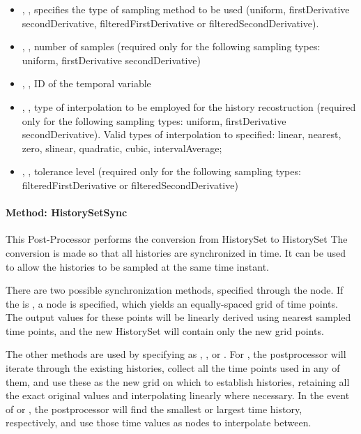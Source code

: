 \begin{itemize}
   \item {}, , specifies the type of sampling method to be used (uniform, firstDerivative secondDerivative, filteredFirstDerivative or
   filteredSecondDerivative).
   \item {}, , number of samples (required only for the following sampling types: uniform, firstDerivative secondDerivative)
   \item {}, , ID of the temporal variable
   \item {}, , type of interpolation to be employed for the history recostruction (required only for the following sampling types: uniform,
   firstDerivative secondDerivative). Valid types of interpolation to specified: linear, nearest, zero, slinear, quadratic, cubic, intervalAverage;
   \item {}, , tolerance level (required only for the following sampling types: filteredFirstDerivative or filteredSecondDerivative)
\end{itemize}

\paragraph{Method: HistorySetSync}
This Post-Processor performs the conversion from HistorySet to HistorySet
The conversion is made so that all histories are synchronized in time.
It can be used to allow the histories to be sampled at the same time instant.

There are two possible synchronization methods, specified through the  node.  If the
 is , a  node is specified,
which yields an equally-spaced grid of time points. The output values for these points will be linearly derived
using nearest sampled time points, and the new HistorySet will contain only the new grid points.

The other methods are used by specifying  as , , or
.  For , the postprocessor will iterate through the
existing histories, collect all the time points used in any of them, and use these as the new grid on which to
establish histories, retaining all the exact original values and interpolating linearly where necessary.
In the event of  or , the postprocessor will find the smallest or largest time
history, respectively, and use those time values as nodes to interpolate between.

